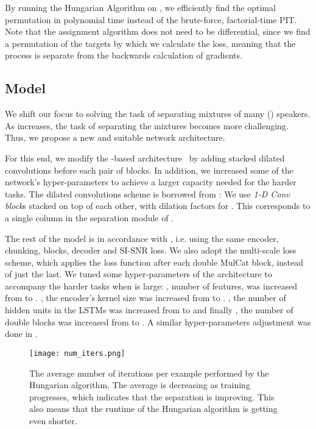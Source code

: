 \documentclass[a4paper]{article}
\begin{document}
\vspace{-0.1cm}

By running the Hungarian Algorithm on , we efficiently find the optimal permutation in polynomial time instead of the brute-force, factorial-time PIT. Note that the assignment algorithm does not need to be differential, since we find a permutation of the targets by which we calculate the loss, meaning that the process is separate from the backwards calculation of gradients.

\vspace{-0.1cm}
\subsection{Model}
We shift our focus to solving the task of separating mixtures of many () speakers. As  increases, the task of separating the mixtures becomes more challenging. Thus, we propose a new and suitable network architecture.

For this end, we modify the -based architecture~\cite{nachmani2020voice} by adding stacked dilated convolutions before each pair of  blocks. In addition, we increased some of the network's hyper-parameters to achieve a larger capacity needed for the harder tasks. The dilated convolutions scheme is borrowed from \cite{luo2019conv}: We use  \textit{1-D Conv block}s stacked on top of each other, with dilation factors  for . This corresponds to a single column in the separation module of \cite{luo2019conv}.

The rest of the model is in accordance with \cite{nachmani2020voice}, i.e. using the same encoder, chunking,  blocks, decoder and SI-SNR loss. We also adopt the multi-scale loss scheme, which applies the loss function after each double MulCat block, instead of just the last. We tuned some hyper-parameters of the architecture to accompany the harder tasks when  is large: , number of features, was increased from  to . , the encoder's kernel size was increased from  to . , the number of hidden units in the LSTMs was increased from  to   and finally , the number of double  blocks was increased from  to . A similar hyper-parameters adjustment was done in \cite{tachibana2020towards}.


\begin{figure}[h]
    \centering

    \texttt{[image: num\_iters.png]} 
    \caption{The average number of iterations per example performed by the Hungarian algorithm. The average is decreasing as training progresses, which indicates that the separation is improving. This also means that the runtime of the Hungarian algorithm is getting even shorter.}
    \label{fig:HungaryWeight}
    \vspace{-.41cm}
\end{figure}
\vspace{-2mm}
\end{document}

